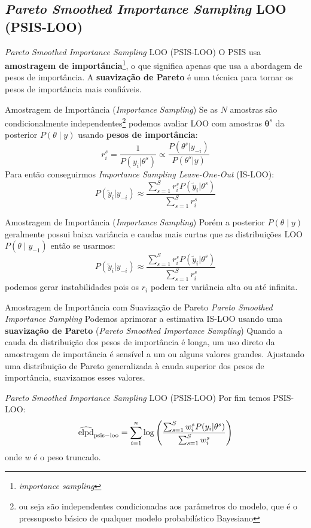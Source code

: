 \subsection{\textit{Pareto Smoothed Importance Sampling} LOO (PSIS-LOO)}
\begin{frame}{\textit{Pareto Smoothed Importance Sampling} LOO (PSIS-LOO)}
    O PSIS usa \textbf{amostragem de importância}\footnote{\textit{importance sampling}},
    o que significa apenas que usa a abordagem de pesos de importância.
    \vfill
    A \textbf{suavização de Pareto} é uma técnica para tornar os pesos de importância
    mais confiáveis.
\end{frame}
\begin{frame}{Amostragem de Importância (\textit{Importance Sampling})}
    Se as $N$ amostras são condicionalmente independentes\footnote{ou seja
    são independentes condicionadas aos parâmetros do modelo, que é o pressuposto
    básico de qualquer modelo probabilístico Bayesiano} \parencite{gelfand1992model}
    podemos avaliar LOO com amostras $\boldsymbol{\theta}^s$ da posterior
    $P(\theta \mid y)$ usando \textbf{pesos de importância}:
    $$
    r_i^s=\frac{1}{P(y_i|\theta^s)} \propto \frac{P(\theta^s|y_{-i})}{P(\theta^s|y)}
    $$
    Para então conseguirmos \textit{Importance Sampling Leave-One-Out} (IS-LOO):
    $$
    P(\tilde{y}_i|y_{-i})
    \approx
    \frac{\sum_{s=1}^S r_i^s P(\tilde{y}_i|\theta^s)}{\sum_{s=1}^S r_i^s}
    $$
\end{frame}

\begin{frame}{Amostragem de Importância (\textit{Importance Sampling})}
    Porém a posterior $P(\theta \mid y)$ geralmente possui baixa variância e caudas
    mais curtas que as distribuições LOO $P(\theta \mid y_{-1})$ então se usarmos:
    $$
    P(\tilde{y}_i|y_{-i}) \approx \frac{\sum_{s=1}^S r_i^s P(\tilde{y}_i|\theta^s)}{\sum_{s=1}^S r_i^s}
    $$
    podemos gerar instabilidades pois os $r_i$ podem ter variância alta ou até infinita.
\end{frame}

\begin{frame}{Amostragem de Importância com Suavização de Pareto \textit{Pareto Smoothed Importance Sampling}}
    Podemos aprimorar a estimativa IS-LOO usando uma \textbf{suavização de Pareto}
    (\textit{Pareto Smoothed Importance Sampling}) \parencite{vehtariPracticalBayesianModel2015}
    \vfill
    Quando a cauda da distribuição dos pesos de importância é longa, um uso direto
    da amostragem de importância é sensível a um ou alguns valores grandes.
    Ajustando uma distribuição de Pareto generalizada à cauda superior dos pesos de
    importância, suavizamos esses valores.
\end{frame}
\begin{frame}{\textit{Pareto Smoothed Importance Sampling} LOO (PSIS-LOO)}
    Por fim temos PSIS-LOO:
    $$
    \widehat{\operatorname{elpd}}_{\rm psis-loo} =
    \sum_{i=1}^n \log
    \left(\frac{\sum_{s=1}^S w_i^s P(y_i|\theta^s)}{\sum_{s=1}^Sw_i^s} \right)
    $$
    onde $w$ é o peso truncado.
\end{frame}

